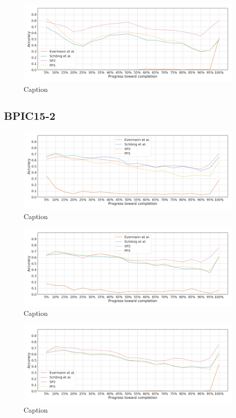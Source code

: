\begin{figure}[!htb]
    \centering
    \includegraphics[width=\textwidth]{gfx/bpic2015_1/windowed_stability.png}
    \caption{Caption}
    \label{fig:my_label}
\end{figure}

\FloatBarrier
\subsection{BPIC15-2}
\begin{figure}[!htb]
    \centering
    \includegraphics[width=\textwidth]{gfx/bpic2015_2/individual_stability.png}
    \caption{Caption}
    \label{fig:my_label}
\end{figure}
\begin{figure}[!htb]
    \centering
    \includegraphics[width=\textwidth]{gfx/bpic2015_2/grouped_stability.png}
    \caption{Caption}
    \label{fig:my_label}
\end{figure}
\begin{figure}[!htb]
    \centering
    \includegraphics[width=\textwidth]{gfx/bpic2015_2/padded_stability.png}
    \caption{Caption}
    \label{fig:my_label}
\end{figure}
